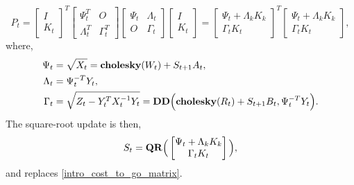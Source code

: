 \begin{equation}
	P_t = \begin{bmatrix} I \\ K_t \end{bmatrix}^T 
		   \begin{bmatrix} \Psi_t^T & O \\ \Lambda_t^T & \Gamma_t^T \end{bmatrix}
		   \begin{bmatrix} \Psi_t & \Lambda_t \\ O & \Gamma_t \end{bmatrix}
		   \begin{bmatrix} I \\ K_t \end{bmatrix}
		= \begin{bmatrix} \Psi_t + \Lambda_k K_k \\ \Gamma_t K_t \end{bmatrix}^T 
		   \begin{bmatrix} \Psi_t + \Lambda_k K_k \\ \Gamma_t K_t \end{bmatrix},
\end{equation}
where, 
\begin{align}
	\Psi_t & = \sqrt{X_t} = \mbox{\textbf{cholesky}}(W_t) + S_{t+1} A_t, \\
	\Lambda_t &= \Psi_t^{-T} Y_t, \\
	\Gamma_t &= \sqrt{Z_t - Y_t^T X_t^{-1} Y_t} =  \mbox{\textbf{DD}}\Big(\mbox{\textbf{cholesky}}(R_t) + S_{t+1} B_t, \Psi_t^{-T} Y_t \Big).
\end{align}
The square-root update is then, 
\begin{equation}
	S_t = \mbox{\textbf{QR}}\Big(\begin{bmatrix} \Psi_t + \Lambda_k K_k \\ \Gamma_t K_t \end{bmatrix} \Big),
\end{equation}
and replaces \eqref{intro_cost_to_go_matrix}.

